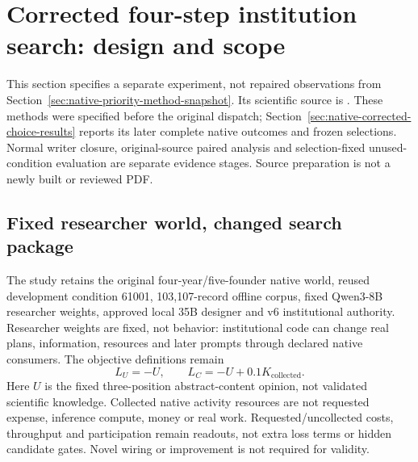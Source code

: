 \section{Corrected four-step institution search: design and scope}
\label{sec:native-corrected-choice-design}

This section specifies a separate experiment, not repaired observations from
Section~\ref{sec:native-priority-method-snapshot}. Its scientific source is
. These methods were specified before the original dispatch;
Section~\ref{sec:native-corrected-choice-results} reports its later complete
native outcomes and frozen selections. Normal writer closure, original-source
paired analysis and selection-fixed unused-condition evaluation are separate
evidence stages. Source preparation is not a newly built or reviewed PDF.

\subsection{Fixed researcher world, changed search package}
The study retains the original four-year/five-founder native world, reused
development condition 61001, 103,107-record offline corpus, fixed Qwen3-8B
researcher weights, approved local 35B designer and v6 institutional authority.
Researcher weights are fixed, not behavior: institutional code can change real
plans, information, resources and later prompts through declared native
consumers. The objective definitions remain
\[
 L_U=-U,\qquad L_C=-U+0.1K_{\mathrm{collected}}.
\]
Here $U$ is the fixed three-position abstract-content opinion, not validated
scientific knowledge. Collected native activity resources are not requested
expense, inference compute, money or real work. Requested/uncollected costs,
throughput and participation remain readouts, not extra loss terms or hidden
candidate gates. Novel wiring or improvement is not required for validity.

